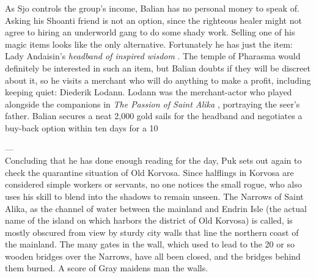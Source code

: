 As Sjo controls the group's income, Balian has no personal money to speak of. Asking his Shoanti friend is not an option, since the righteous healer might not agree to hiring an underworld gang to do some shady work. Selling one of his magic items looks like the only alternative. Fortunately he has just the item: Lady Andaisin's {\itshape headband of inspired wisdom} . The temple of Pharasma would definitely be interested in such an item, but Balian doubts if they will be discreet about it, so he visits a merchant who will do anything to make a profit, including keeping quiet: Diederik Lodann. Lodann was the merchant-actor who played alongside the companions in  {\itshape The Passion of Saint Alika} , portraying the seer's father. Balian secures a neat 2,000 gold sails for the headband and negotiates a buy-back option within ten days for a 10 %

---\\

Concluding that he has done enough reading for the day, Puk sets out again to check the quarantine situation of Old Korvosa. Since halflings in Korvosa are considered simple workers or servants, no one notices the small rogue, who also uses his skill to blend into the shadows to remain unseen. The Narrows of Saint Alika, as the channel of water between the mainland and Endrin Isle (the actual name of the island on which harbors the district of Old Korvosa) is called, is mostly obscured from view by sturdy city walls that line the northern coast of the mainland. The many gates in the wall, which used to lead to the 20 or so wooden bridges over the Narrows, have all been closed, and the bridges behind them burned. A score of Gray maidens man the walls.\\

